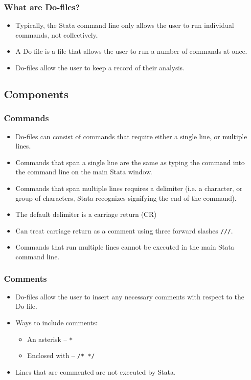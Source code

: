 \documentclass{beamer}
\begin{document}
\begin{frame}
	\frametitle{What are Do-files?}
		\begin{itemize}
			\item Typically, the Stata command line only allows the user to run individual commands, not collectively.
			\item A Do-file is a file that allows the user to run a number of commands at once.
			\item Do-files allow the user to keep a record of their analysis.
		\end{itemize}
\end{frame}

\subsection{Components}

\begin{frame}
	\frametitle{Commands}
		\begin{itemize}
			\item Do-files can consist of commands that require either a single line, or multiple lines.
			\item Commands that span a single line are the same as typing the command into the command line on the main Stata window.
			\item Commands that span multiple lines requires a delimiter (i.e. a character, or group of characters, Stata recognizes signifying the end of the command).
			\item The default delimiter is a carriage return (CR)
			\item Can treat carriage return as a comment using three forward slashes \texttt{///}.
			\item Commands that run multiple lines cannot be executed in the main Stata command line.
		\end{itemize}
\end{frame}

\begin{frame}
	\frametitle{Comments}
		\begin{itemize}
			\item Do-files allow the user to insert any necessary comments with respect to the Do-file.
			\item Ways to include comments:
				\begin{itemize}
					\item An asterisk -- \texttt{*}
					\item Enclosed with -- \texttt{/* */}
				\end{itemize}
			\item Lines that are commented are not executed by Stata.
		\end{itemize}
\end{frame}
\end{document}
